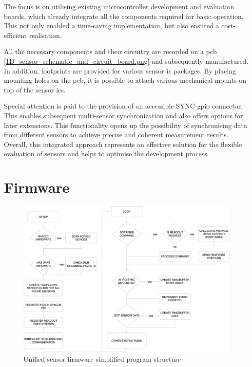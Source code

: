 The focus is on utilising existing microcontroller development and
evaluation boards, which already integrate all the components required
for basic operation. This not only enabled a time-saving implementation,
but also ensured a cost-efficient realisation.

All the necessary components and their circuitry are recorded on a
\gls{pcb} \ref{1D_sensor_schematic_and_circuit_board.png} and
subsequently manufactured. In addition, footprints are provided for
various sensor \gls{ic} packages. By placing mounting holes on the
\gls{pcb}, it is possible to attach various mechanical mounts on top of
the sensor \gls{ic}s.

Special attention is paid to the provision of an accessible
SYNC-\gls{gpio} connector. This enables subsequent multi-sensor
synchronization and also offers options for later extensions. This
functionality opens up the possibility of synchronising data from
different sensors to achieve precise and coherent measurement results.
Overall, this integrated approach represents an effective solution for
the flexible evaluation of sensors and helps to optimise the development
process.

\hypertarget{firmware}{%
\section{Firmware}\label{firmware}}

\begin{figure}
\centering
\includegraphics{./generated_images/border_Unified_sensor_firmware_simplified_program_structure.png}
\caption{Unified sensor firmware simplified program structure
\label{Unified_sensor_firmware_simplified_program_structure.png}}
\end{figure}

